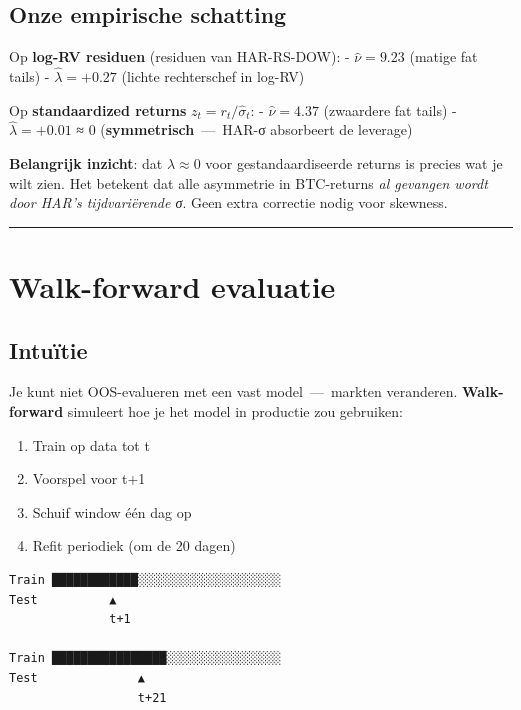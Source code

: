 \documentclass[11pt,a4paper]{article}
\begin{document}
\hypertarget{onze-empirische-schatting}{%
\subsection{Onze empirische schatting}\label{onze-empirische-schatting}}

Op \textbf{log-RV residuen} (residuen van HAR-RS-DOW):
- \(\hat\nu = 9.23\) (matige fat tails)
- \(\hat\lambda = +0.27\) (lichte rechterschef in log-RV)

Op \textbf{standaardized returns} \(z_t = r_t/\hat\sigma_t\):
- \(\hat\nu = 4.37\) (zwaardere fat tails)
- \(\hat\lambda = +0.01\) ≈ 0 (\textbf{symmetrisch} \,---\, HAR-σ absorbeert de leverage)

\textbf{Belangrijk inzicht}: dat \(\lambda \approx 0\) voor gestandaardiseerde returns is precies wat je wilt zien. Het betekent dat alle asymmetrie in BTC-returns \emph{al gevangen wordt door HAR's tijdvariërende σ}. Geen extra correctie nodig voor skewness.

\begin{center}\rule{0.5\linewidth}{0.5pt}\end{center}

\hypertarget{walk-forward-evaluatie}{%
\section{Walk-forward evaluatie}\label{walk-forward-evaluatie}}

\hypertarget{intuuxeftie-6}{%
\subsection{Intuïtie}\label{intuuxeftie-6}}

Je kunt niet OOS-evalueren met een vast model \,---\, markten veranderen. \textbf{Walk-forward} simuleert hoe je het model in productie zou gebruiken:

\begin{enumerate}
\def\labelenumi{\arabic{enumi}.}
\tightlist
\item
  Train op data tot t
\item
  Voorspel voor t+1
\item
  Schuif window één dag op
\item
  Refit periodiek (om de 20 dagen)
\end{enumerate}

\begin{lstlisting}
Train ████████████░░░░░░░░░░░░░░░░░░░░
Test          ▲                       
              t+1
                
Train ████████████████░░░░░░░░░░░░░░░░
Test              ▲                   
                  t+21
\end{lstlisting}
\end{document}
